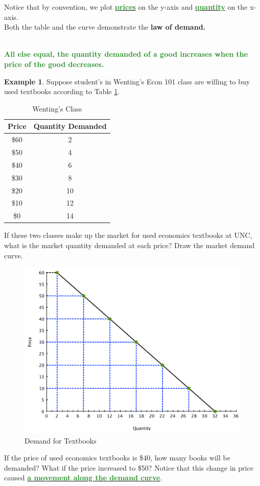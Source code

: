 \documentclass[11pt]{article}\usepackage[]{graphicx}\usepackage[]{color}
\theoremstyle{definition}
\newtheorem{exmp}{Example}[section]
\newcommand{\ddp}[1]{{\textbf{\textcolor{ForestGreen}{#1}}}}
\newcommand{\dd}[1]{{\underline{\textbf{\textcolor{ForestGreen}{#1}}}}}
\newcommand{\defn}[1]{\textbf{#1}}
\begin{document}
	Notice that by convention, we plot \dd{prices} on the y-axis and \dd{quantity} on the x-axis.
	\\
	
	Both the table and the curve demonstrate the \defn{law of demand.}
	
	\ddp{\\ All else equal, the quantity demanded of a good increases when the price of the good decreases.}
	
	\begin{exmp}
		
	Suppose student's in Wenting's Econ 101 class are willing to buy used textbooks according to Table \ref{tab2}.
	
	\begin{table}[ht]
		\caption{Wenting's Class}
		\label{tab2}
		\centering
		\begin{tabular}{  c|c}        
			
			Price   & Quantity Demanded \\
			\hline
			\$60 & 2 \\
			\$50 & 4 \\
			\$40 & 6 \\
			\$30 &  8 \\
			\$20& 10 \\
			\$10 & 12 \\
			\$0 & 14 \\
		\end{tabular}
	\end{table} 
	
	If these two classes make up the market for used economics textbooks at UNC, what is the market quantity demanded at each price? Draw the market demand curve.
		
			\begin{figure}[H]
				\centering
				\includegraphics[scale=.35]{plot8.pdf}
				\caption{Demand for Textbooks}
			\end{figure}
			
	If the price of used economics textbooks is \$40, how many books will be demanded? What if the price increased to \$50? Notice that this change in price caused \dd{a movement along the demand curve}.
	\end{exmp}
	
\end{document}
